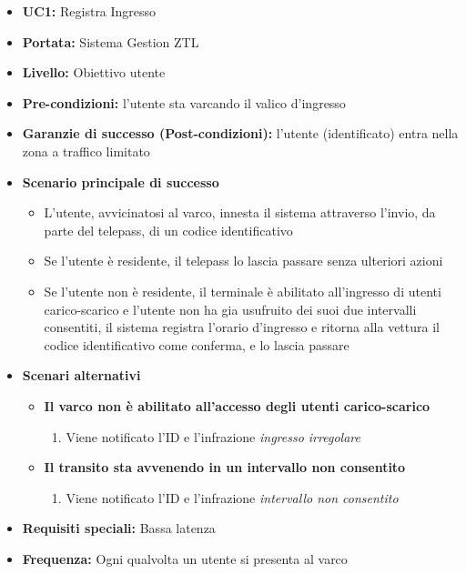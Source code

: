 \documentclass[12pt, letterpaper]{article}
\begin{document}
\begin{itemize}
    \item \textbf{UC1:} Registra Ingresso
    \item \textbf{Portata:} Sistema Gestion ZTL
    \item \textbf{Livello:} Obiettivo utente
    \item \textbf{Pre-condizioni:} l'utente sta varcando 
    il valico d'ingresso
    \item \textbf{Garanzie di successo (Post-condizioni):} 
    l'utente (identificato) entra nella zona a traffico 
    limitato
    
    \item \textbf{Scenario principale di successo}
    \begin{itemize}
        \item L'utente, avvicinatosi al varco, 
        innesta il sistema attraverso l'invio, 
        da parte del telepass, di un codice 
        identificativo
        \item Se l'utente è residente, 
        il telepass lo lascia passare senza 
        ulteriori azioni
        \item Se l'utente non è residente, 
        il terminale è abilitato all'ingresso 
        di utenti carico-scarico e l'utente non 
        ha gia usufruito dei suoi due intervalli 
        consentiti, il sistema registra l'orario 
        d'ingresso e ritorna alla vettura il codice 
        identificativo come conferma, e lo lascia 
        passare
    \end{itemize}
    
    \item \textbf{Scenari alternativi}
    \begin{itemize}
        \item \textbf{Il varco non è 
        abilitato all'accesso degli utenti 
        carico-scarico}
        \begin{enumerate}
            \item Viene notificato l'ID e l'infrazione
            \emph{ingresso irregolare}
        \end{enumerate}
        \item \textbf{Il transito sta avvenendo 
        in un intervallo non consentito}
        \begin{enumerate}
            \item Viene notificato l'ID e l'infrazione 
            \emph{intervallo non consentito}  
        \end{enumerate}
    \end{itemize}
    
    \item \textbf{Requisiti speciali:} Bassa latenza
    \item \textbf{Frequenza:} Ogni qualvolta un utente si 
    presenta al varco
\end{itemize}
\end{document}
